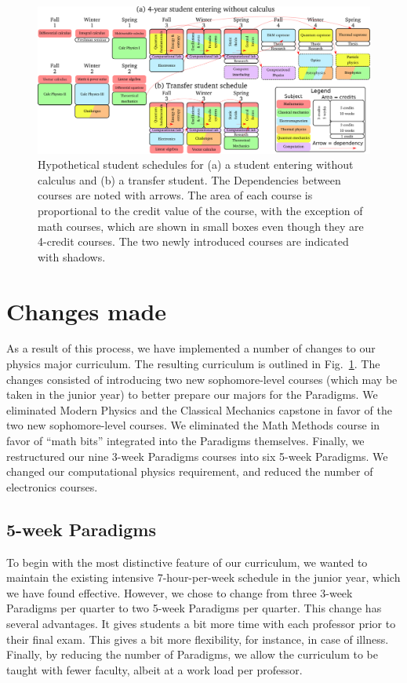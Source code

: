 \documentclass[english,aps,pra,reprint,noshowpacs,superscriptaddress]{revtex4-1}
\begin{document}
\begin{figure}
\includegraphics[width=\textwidth]{schedule}
\caption{Hypothetical student schedules for (a) a student entering
  without calculus and (b) a transfer student.  The Dependencies
  between courses are noted with arrows.  The area of each course is
  proportional to the credit value of the course, with the exception
  of math courses, which are shown in small boxes even though they are
  4-credit courses.  The two newly introduced courses are indicated
  with shadows.\label{fig:schedule}}
\end{figure}

\section{Changes made}
As a result of this process, we have implemented a number of changes
to our physics major curriculum.  The resulting curriculum is outlined
in Fig.~\ref{fig:schedule}.  The changes consisted of introducing two
new sophomore-level courses (which may be taken in the junior year) to
better prepare our majors for the Paradigms.  We eliminated Modern
Physics and the Classical Mechanics capstone in favor of the two new
sophomore-level courses.  We eliminated the Math Methods course in
favor of ``math bits'' integrated into the Paradigms themselves.
Finally, we restructured our nine 3-week Paradigms courses into six
5-week Paradigms.  We changed our computational physics requirement,
and reduced the number of electronics courses.

\subsection{5-week Paradigms}
To begin with the most distinctive feature of our curriculum, we
wanted to maintain the existing intensive 7-hour-per-week schedule in
the junior year, which we have found effective.  However, we chose to
change from three 3-week Paradigms per quarter to two 5-week Paradigms
per quarter.    This change has several advantages.  It gives students
a bit more time with each professor prior to their final exam.  This
gives a bit more flexibility, for instance, in case of illness.
Finally, by reducing the number of Paradigms, we allow the curriculum
to be taught with fewer faculty, albeit at a work load per professor.
\end{document}
